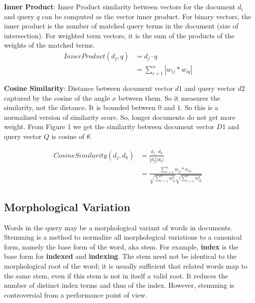 \textbf{Inner Product}: Inner Product similarity between vectors for the document $d_i$ and query $q$ can be computed as the vector inner product. For binary vectors, the inner product is the number of matched query terms in the document (size of intersection). For weighted term vectors, it is the sum of the products of the weights of the matched terms.
\begin{equation} \label{eq:inner_prod}
\begin{split}
  Inner Product(d_j, q) & = d_j \cdot q \\
                           & = \sum_{i = 1}^{n} {|w_{ij} * w_{iq}|}
\end{split}
\end{equation}

\textbf{Cosine Similarity}: Distance between document vector ${d1}$ and query vector ${d2}$ captured by the cosine of the angle ${x}$ between them. So it measures the similarity, not the distance. It is bounded between $0$ and $1$. So this is a normalized version of similarity score. So, longer documents do not get more weight. From Figure 1 we get the similarity between document vector ${D1}$ and query vector ${Q}$ is cosine of ${θ}$.

\begin{equation}
\begin{split}
  Cosine Similarity(d_j, d_k) & = \frac{d_j \cdot d_k}{|d_j||d_k|} \\
                              & = \frac{\sum_{i = 1}^{n} {w_{ij} * w_{ik}}}{\sqrt{\sum_{i = 1}^{n} w_{ij}^2}\sqrt{\sum_{i = 1}^{n} w_{ik}^2}}
\end{split}
\end{equation}

\subsection{Morphological Variation}
Words in the query may be a morphological variant of words in documents. Stemming \cite{stem-algo} is a
method to normalize all morphological variations to a canonical form, namely the base form of
the word, aka stem. For example, \textbf{index} is the base form for \textbf{indexed} and \textbf{indexing}. The stem need not be identical to the morphological root of the word; it is usually sufficient that related
words map to the same stem, even if this stem is not in itself a valid root. It reduces the number
of distinct index terms and thus of the index. However, stemming is controversial from a
performance point of view.